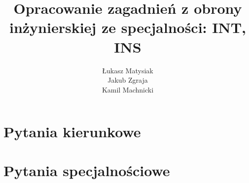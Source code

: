 \documentclass[11pt,a4paper]{article}
\title{Opracowanie zagadnień z obrony inżynierskiej ze specjalności: INT, INS}
\author{Łukasz Matysiak\\Jakub Zgraja\\Kamil Machnicki}
\makeatletter
\newcommand{\University}{Politechnika Wrocławska}
\newcommand{\Department}{Wydział Elektroniki}
\newcommand{\Faculty}{Informatyka}
\renewcommand{\maketitle}{
\begin{titlepage}
    \begin{center}
        \huge\textsc{{\University}}\\
        \Large\textsc{{\Department}}\\
        \Large\textsc{{\Faculty}}\par
        
        \vspace{5cm}
        \huge\textbf{\@title}\par
        
        \vspace{6cm}
        \large\textit{Autorzy:}\\ 
        \Large\textbf{\@author}\par 
        
        \vspace{4.5cm}
        \small Wrocław \\
        \small \@date \\
    \end{center}
\end{titlepage}
}
\makeatother
\begin{document}
\tableofcontents
\newpage

\part{Pytania kierunkowe}


\part{Pytania specjalnościowe}

\end{document}
